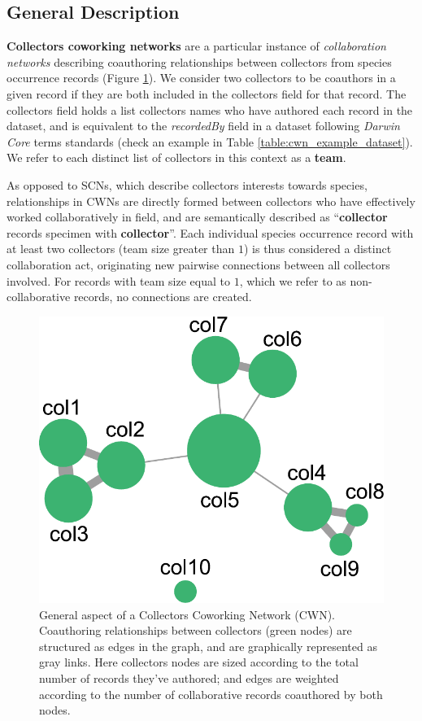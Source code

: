 {\subsection{General Description}
\textbf{Collectors coworking networks} are a particular instance of \textit{collaboration networks} describing coauthoring relationships between collectors from species occurrence records (Figure \ref{fig:cwn_general}).
We consider two collectors to be coauthors in a given record if they are both included in the collectors field for that record. The collectors field holds a list collectors names who have authored each record in the dataset, and is equivalent to the \textit{recordedBy} field in a dataset following \textit{Darwin Core} terms standards (check an example in Table \ref{table:cwn_example_dataset}). We refer to each distinct list of collectors in this context as a \textbf{team}.

As opposed to SCNs, which describe collectors interests towards species, relationships in CWNs are directly formed between collectors who have effectively worked collaboratively in field, and are semantically described as ``\textbf{collector} records specimen with \textbf{collector}''.
Each individual species occurrence record with at least two collectors (team size greater than $1$) is thus considered a distinct collaboration act, originating new pairwise connections between all collectors involved.
For records with team size equal to $1$, which we refer to as non-collaborative records, no connections are created.

  \begin{figure}[h!]
  	\centering
    \includegraphics[width=.4\linewidth]{figures/network_models/cwn_generalaspect.pdf}
    \caption{General aspect of a Collectors Coworking Network (CWN). Coauthoring relationships between collectors (green nodes) are structured as edges in the graph, and are graphically represented as gray links.
    Here collectors nodes are sized according to the total number of records they've authored; and edges are weighted according to the number of collaborative records coauthored by both nodes.}
    \label{fig:cwn_general}
  \end{figure}

}
